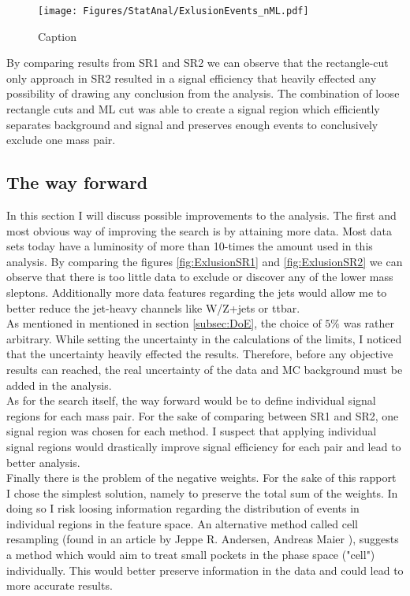 \documentclass{article}
\begin{document}
\begin{figure}
    \centering
    \texttt{[image: Figures/StatAnal/ExlusionEvents\_nML.pdf]}
    \caption{Caption}
    \label{fig:my_label}
\end{figure}
By comparing results from SR1 and SR2 we can observe that the rectangle-cut only approach in SR2 resulted in a signal efficiency that heavily effected any possibility of drawing any conclusion from the analysis. The combination of loose rectangle cuts and ML cut was able to create a signal region which efficiently separates background and signal and preserves enough events to conclusively exclude one mass pair. 
\subsection{The way forward}
In this section I will discuss possible improvements to the analysis. The first and most obvious way of improving the search is by attaining more data. Most data sets today have a luminosity of more than 10-times the amount used in this analysis. By comparing the figures \ref{fig:ExlusionSR1} and \ref{fig:ExlusionSR2} we can observe that there is too little data to exclude or discover any of the lower mass sleptons. Additionally more data features regarding the jets would allow me to better reduce the jet-heavy channels like W/Z+jets or ttbar. 
\\
As mentioned in mentioned in section \ref{subsec:DoE}, the choice of $5\%$ was rather arbitrary. While setting the uncertainty in the calculations of the limits, I noticed that the uncertainty heavily effected the results. Therefore, before any objective results can reached, the real uncertainty of the data and MC background must be added in the analysis.
\\
As for the search itself, the way forward would be to define individual signal regions for each mass pair. For the sake of comparing between SR1 and SR2, one signal region was chosen for each method. I suspect that applying individual signal regions would drastically improve signal efficiency for each pair and lead to better analysis. 
\\
Finally there is the problem of the negative weights. For the sake of this rapport I chose the simplest solution, namely to preserve the total sum of the weights. In doing so I risk loosing information regarding the distribution of events in individual regions in the feature space. An alternative method called cell resampling (found in an article by Jeppe R. Andersen, Andreas Maier \cite{cell}), suggests a method which would aim to treat small pockets in the phase space ("cell") individually. This would better preserve information in the data and could lead to more accurate results.
\end{document}
